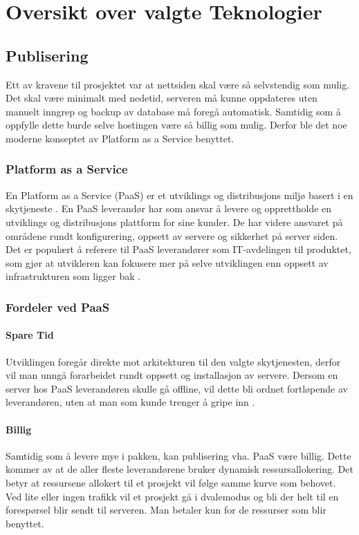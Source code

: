 \chapter{Oversikt over valgte Teknologier}

\section{Publisering}
Ett av kravene til prosjektet var at nettsiden skal være så selvstendig som mulig. Det skal være minimalt med nedetid, serveren må kunne oppdateres uten manuelt inngrep og backup av database må foregå automatisk. Samtidig som å oppfylle dette burde selve hostingen være så billig som mulig. Derfor ble det noe moderne konseptet av Platform as a Service benyttet.

\subsection{Platform as a Service}
En Platform as a Service (PaaS) er et utviklings og distribusjons miljø basert i en skytjeneste \cite{ paas:azure}. En PaaS leverandør har som ansvar å levere og opprettholde en utviklings og distribusjons plattform for sine kunder. De har videre ansvaret på områdene rundt konfigurering, oppsett av servere og sikkerhet på server siden. Det er populært å referere til  PaaS leverandører som IT-avdelingen til produktet, som gjør at utvikleren kan fokusere mer på selve utviklingen enn oppsett av infrastrukturen som ligger bak \cite[s. 10]{bachelor}.

\subsection{Fordeler ved PaaS}
\subsubsection*{Spare Tid}
Utviklingen foregår direkte mot arkitekturen til den valgte skytjenesten, derfor vil man unngå forarbeidet rundt oppsett og installasjon av servere. Dersom en server hos PaaS leverandøren skulle gå offline, vil dette bli ordnet fortløpende av leverandøren, uten at man som kunde trenger å gripe inn \cite[s. 9]{bachelor}.

\subsubsection*{Billig}
Samtidig som å levere mye i pakken, kan publisering vha. PaaS være billig. Dette kommer av at de aller fleste leverandørene bruker dynamisk ressursallokering. Det betyr at ressursene allokert til et prosjekt vil følge samme kurve som behovet. Ved lite eller ingen trafikk vil et prosjekt gå i dvalemodus og bli der helt til en forespørsel blir sendt til serveren. Man betaler kun for de ressurser som blir benyttet.

